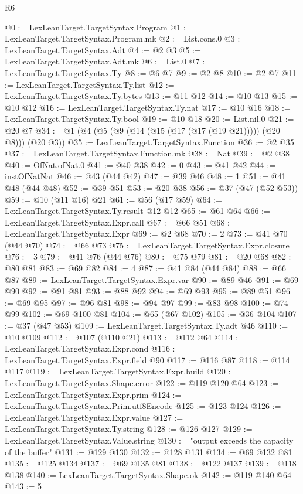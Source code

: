 \begin{lexlean}{R6}
\begin{coremodule}
@0 := LexLeanTarget.TargetSyntax.Program
@1 := LexLeanTarget.TargetSyntax.Program.mk
@2 := List.cons.{0}
@3 := LexLeanTarget.TargetSyntax.Adt
@4 := @2 @3
@5 := LexLeanTarget.TargetSyntax.Adt.mk
@6 := List.{0}
@7 := LexLeanTarget.TargetSyntax.Ty
@8 := @6 @7
@9 := @2 @8
@10 := @2 @7
@11 := LexLeanTarget.TargetSyntax.Ty.list
@12 := LexLeanTarget.TargetSyntax.Ty.bytes
@13 := @11 @12
@14 := @10 @13
@15 := @10 @12
@16 := LexLeanTarget.TargetSyntax.Ty.nat
@17 := @10 @16
@18 := LexLeanTarget.TargetSyntax.Ty.bool
@19 := @10 @18
@20 := List.nil.{0}
@21 := @20 @7
@34 := @1 (@4 (@5 (@9 (@14 (@15 (@17 (@17 (@19 @21))))) (@20 @8))) (@20 @3))
@35 := LexLeanTarget.TargetSyntax.Function
@36 := @2 @35
@37 := LexLeanTarget.TargetSyntax.Function.mk
@38 := Nat
@39 := @2 @38
@40 := OfNat.ofNat.{0}
@41 := @40 @38
@42 := 0
@43 := @41 @42
@44 := instOfNatNat
@46 := @43 (@44 @42)
@47 := @39 @46
@48 := 1
@51 := @41 @48 (@44 @48)
@52 := @39 @51
@53 := @20 @38
@56 := @37 (@47 (@52 @53))
@59 := @10 (@11 @16) @21
@61 := @56 (@17 @59)
@64 := LexLeanTarget.TargetSyntax.Ty.result @12 @12
@65 := @61 @64
@66 := LexLeanTarget.TargetSyntax.Expr.call
@67 := @66 @51
@68 := LexLeanTarget.TargetSyntax.Expr
@69 := @2 @68
@70 := 2
@73 := @41 @70 (@44 @70)
@74 := @66 @73
@75 := LexLeanTarget.TargetSyntax.Expr.closure
@76 := 3
@79 := @41 @76 (@44 @76)
@80 := @75 @79
@81 := @20 @68
@82 := @80 @81
@83 := @69 @82
@84 := 4
@87 := @41 @84 (@44 @84)
@88 := @66 @87
@89 := LexLeanTarget.TargetSyntax.Expr.var
@90 := @89 @46
@91 := @69 @90
@92 := @91 @81
@93 := @88 @92
@94 := @69 @93
@95 := @89 @51
@96 := @69 @95
@97 := @96 @81
@98 := @94 @97
@99 := @83 @98
@100 := @74 @99
@102 := @69 @100 @81
@104 := @65 (@67 @102)
@105 := @36 @104
@107 := @37 (@47 @53)
@109 := LexLeanTarget.TargetSyntax.Ty.adt @46
@110 := @10 @109
@112 := @107 (@110 @21)
@113 := @112 @64
@114 := LexLeanTarget.TargetSyntax.Expr.cond
@116 := LexLeanTarget.TargetSyntax.Expr.field @90
@117 := @116 @87
@118 := @114 @117
@119 := LexLeanTarget.TargetSyntax.Expr.build
@120 := LexLeanTarget.TargetSyntax.Shape.error
@122 := @119 @120 @64
@123 := LexLeanTarget.TargetSyntax.Expr.prim
@124 := LexLeanTarget.TargetSyntax.Prim.utf8Encode
@125 := @123 @124
@126 := LexLeanTarget.TargetSyntax.Expr.value
@127 := LexLeanTarget.TargetSyntax.Ty.string
@128 := @126 @127
@129 := LexLeanTarget.TargetSyntax.Value.string
@130 := "output exceeds the capacity of the buffer"
@131 := @129 @130
@132 := @128 @131
@134 := @69 @132 @81
@135 := @125 @134
@137 := @69 @135 @81
@138 := @122 @137
@139 := @118 @138
@140 := LexLeanTarget.TargetSyntax.Shape.ok
@142 := @119 @140 @64
@143 := 5

\end{coremodule}
\end{lexlean}
